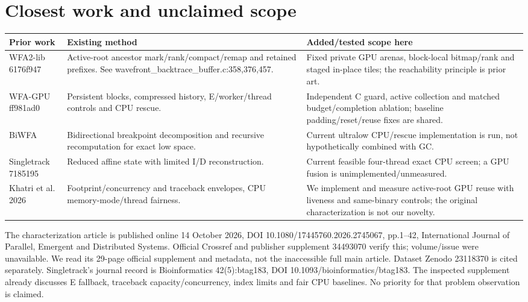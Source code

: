 \documentclass[11pt,a4paper]{article}
\begin{document}
\section{Closest work and unclaimed scope}
\begin{center}\small\begin{tabular}{>{\raggedright\arraybackslash}p{}>{\raggedright\arraybackslash}p{}>{\raggedright\arraybackslash}p{}}\toprule
Prior work & Existing method & Added/tested scope here\\\midrule
WFA2-lib 6176f947 & Active-root ancestor mark/rank/compact/remap and retained prefixes. See wavefront\_backtrace\_buffer.c:358,376,457. & Fixed private GPU arenas, block-local bitmap/rank and staged in-place tiles; the reachability principle is prior art.\\
WFA-GPU ff981ad0 & Persistent blocks, compressed history, E/worker/thread controls and CPU rescue. & Independent C guard, active collection and matched budget/completion ablation; baseline padding/reset/reuse fixes are shared.\\
BiWFA & Bidirectional breakpoint decomposition and recursive recomputation for exact low space. & Current ultralow CPU/rescue implementation is run, not hypothetically combined with GC.\\
Singletrack 7185195 & Reduced affine state with limited I/D reconstruction. & Current feasible four-thread exact CPU screen; a GPU fusion is unimplemented/unmeasured.\\
Khatri et al. 2026 & Footprint/concurrency and traceback envelopes, CPU memory-mode/thread fairness. & We implement and measure active-root GPU reuse with liveness and same-binary controls; the original characterization is not our novelty.\\\bottomrule\end{tabular}\end{center}

The characterization article is published online 14 October 2026, DOI 10.1080/17445760.2026.2745067, pp.1--42, International Journal of Parallel, Emergent and Distributed Systems. Official Crossref and publisher supplement 34493070 verify this; volume/issue were unavailable. We read its 29-page official supplement and metadata, not the inaccessible full main article. Dataset Zenodo 23118370 is cited separately. Singletrack's journal record is Bioinformatics 42(5):btag183, DOI 10.1093/bioinformatics/btag183. The inspected supplement already discusses E fallback, traceback capacity/concurrency, index limits and fair CPU baselines. No priority for that problem observation is claimed.
\end{document}
